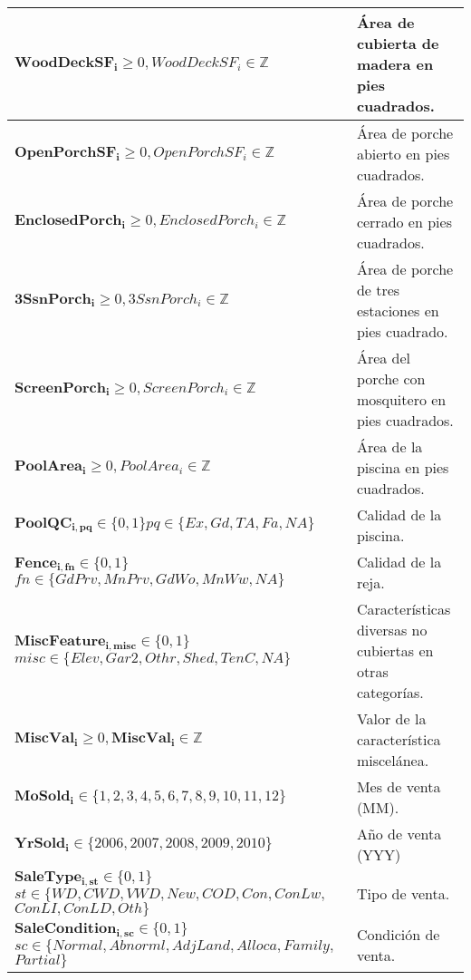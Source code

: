 \begin{longtable}{ | p{8cm} | p{5cm} | }
    \hline
    $\boldsymbol{WoodDeckSF_{i}} \geq 0, WoodDeckSF_{i} \in \mathbb{Z}$ & Área de cubierta de madera en pies cuadrados.\\
    \hline
    $\boldsymbol{OpenPorchSF_{i}} \geq 0, OpenPorchSF_{i} \in \mathbb{Z}$ & Área de porche abierto en pies cuadrados.\\
    \hline
    $\boldsymbol{EnclosedPorch_{i}} \geq 0, EnclosedPorch_{i} \in \mathbb{Z}$ & Área de porche cerrado en pies cuadrados.\\
    \hline
    $\boldsymbol{3SsnPorch_{i}} \geq 0, 3SsnPorch_{i} \in \mathbb{Z}$ & Área de porche de tres estaciones en pies cuadrado.\\
    \hline
    $\boldsymbol{ScreenPorch_{i}} \geq 0, ScreenPorch_{i} \in \mathbb{Z}$ & Área del porche con mosquitero en pies cuadrados.\\
    \hline    
    $\boldsymbol{PoolArea_{i}} \geq 0, PoolArea_{i} \in \mathbb{Z}$ & Área de la piscina en pies cuadrados.\\
    \hline
    $\boldsymbol{PoolQC_{i,pq}} \in \{0, 1\}$\newline $pq \in \{Ex, Gd, TA, Fa, NA\}$ & Calidad de la piscina.\\
    \hline
    $\boldsymbol{Fence_{i,fn}} \in \{0, 1\}$ \newline $fn \in \{GdPrv, MnPrv, GdWo, MnWw, NA\}$ & Calidad de la reja.\\
    \hline
    $\boldsymbol{MiscFeature_{i, misc}} \in \{0, 1\}$\newline 
    $misc \in \{Elev, Gar2, Othr, Shed, TenC, NA\}$ & Características diversas no cubiertas en otras categorías.\\
    \hline
    $\boldsymbol{MiscVal_{i}} \geq 0, \boldsymbol{MiscVal_{i}} \in \mathbb{Z}$ & Valor de la característica miscelánea.\\ 
    \hline
    $\boldsymbol{MoSold_{i}} \in \{1, 2, 3, 4, 5, 6, 7, 8, 9, 10, 11, 12\}$ & Mes de venta (MM).\\
    \hline
    $\boldsymbol{YrSold_{i}} \in \{2006, 2007, 2008, 2009, 2010\}$ & Año de venta (YYY)\\
    \hline
    $\boldsymbol{SaleType_{i,st}} \in \{0, 1\}$ \newline $st \in \{WD, CWD, VWD, New, COD, Con, ConLw,$\newline$ ConLI, ConLD, Oth\}$ & Tipo de venta.\\
    \hline
    $\boldsymbol{SaleCondition_{i, sc}} \in \{0, 1\}$ \newline $sc \in \{Normal, Abnorml, AdjLand, Alloca, Family,$\newline$ Partial\}$& Condición de venta.\\
    \hline
\end{longtable}

